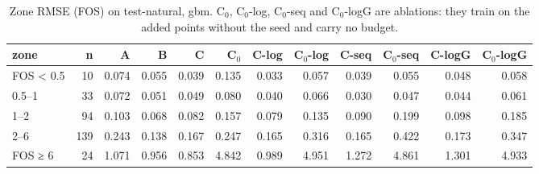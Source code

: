\begin{table}[htbp]
\centering
\small
\setlength{\tabcolsep}{4pt}
\caption{Zone RMSE (FOS) on test-natural, gbm. C$_0$, C$_0$-log, C$_0$-seq and C$_0$-logG are ablations: they train on the added points without the seed and carry no budget.}
\label{tab:test-natural__log-rmse:zones:gbm}
\begin{tabular}{lrrrrrrrrrrr}
\toprule
zone & n & A & B & C & C$_0$ & C-log & C$_0$-log & C-seq & C$_0$-seq & C-logG & C$_0$-logG \\
\midrule
FOS < 0.5 & 10 & 0.074 & 0.055 & 0.039 & 0.135 & 0.033 & 0.057 & 0.039 & 0.055 & 0.048 & 0.058 \\
0.5–1 & 33 & 0.072 & 0.051 & 0.049 & 0.080 & 0.040 & 0.066 & 0.030 & 0.047 & 0.044 & 0.061 \\
1–2 & 94 & 0.103 & 0.068 & 0.082 & 0.157 & 0.079 & 0.135 & 0.090 & 0.199 & 0.098 & 0.185 \\
2–6 & 139 & 0.243 & 0.138 & 0.167 & 0.247 & 0.165 & 0.316 & 0.165 & 0.422 & 0.173 & 0.347 \\
FOS ≥ 6 & 24 & 1.071 & 0.956 & 0.853 & 4.842 & 0.989 & 4.951 & 1.272 & 4.861 & 1.301 & 4.933 \\
\bottomrule
\end{tabular}
\end{table}
